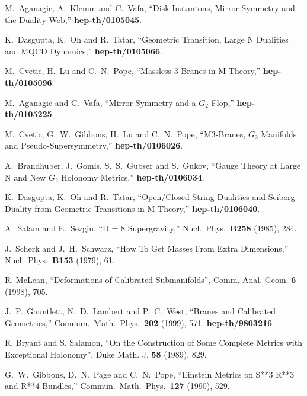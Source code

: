 \documentclass[12pt,a4paper]{article}
\begin{document}
\begin{thebibliography}{99}
 M.~Aganagic, A.~Klemm and C.~Vafa,
``Disk Instantons, Mirror Symmetry and the Duality Web,''
{\bf hep-th/0105045}.

 K.~Dasgupta, K.~Oh and R.~Tatar,
``Geometric Transition, Large N Dualities and MQCD Dynamics,'' {\bf hep-th/0105066}.

 M.~Cvetic, H.~Lu and C.~N.~Pope,
``Massless 3-Branes in M-Theory,'' {\bf hep-th/0105096}.

 M.~Aganagic and C.~Vafa,
``Mirror Symmetry and a $G_2$ Flop,'' {\bf hep-th/0105225}.

 M.~Cvetic, G.~W.~Gibbons, H.~Lu and C.~N.~Pope,
``M3-Branes, $G_2$ Manifolds and Pseudo-Supersymmetry,''
{\bf hep-th/0106026}.

 A.~Brandhuber, J.~Gomis, S.~S.~Gubser and S.~Gukov,
``Gauge Theory at Large N and New $G_2$ Holonomy Metrics,''
{\bf hep-th/0106034}.

 K.~Dasgupta, K.~Oh and R.~Tatar,
``Open/Closed String Dualities and Seiberg Duality from Geometric Transitions in M-Theory,''
{\bf hep-th/0106040}.

 A.~Salam and E.~Sezgin, ``D = 8 Supergravity,''
Nucl.\ Phys.\ {\bf B258} (1985), 284.

 J.~Scherk and J.~H.~Schwarz, ``How To Get Masses From Extra Dimensions,''
Nucl.\ Phys.\ {\bf B153} (1979), 61.

 R. McLean, ``Deformations of Calibrated Submanifolds'', 
Comm. Anal. Geom. {\bf 6} (1998), 705.

 J.~P.~Gauntlett, N.~D.~Lambert and P.~C.~West,
``Branes and Calibrated Geometries,''
Commun.\ Math.\ Phys.\  {\bf 202} (1999), 571. {\bf hep-th/9803216}

 R. Bryant and S. Salamon, ``On the Construction of Some Complete Metrics with 
Exceptional Holonomy'', Duke Math. J. {\bf 58} (1989), 829.

 G.~W.~Gibbons, D.~N.~Page and C.~N.~Pope,
``Einstein Metrics on S**3 R**3 and R**4 Bundles,''
Commun.\ Math.\ Phys.\  {\bf 127} (1990), 529.


\end{thebibliography}
\end{document}
